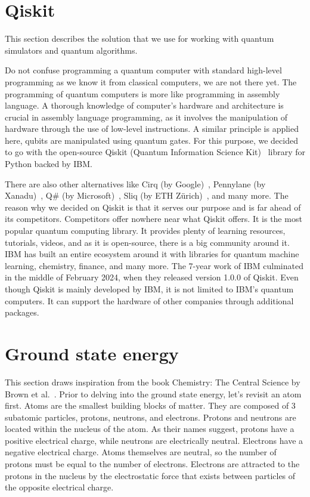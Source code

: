 \section{Qiskit}
This section describes the solution that we use for working with quantum simulators and quantum algorithms.

Do not confuse programming a quantum computer with standard high-level programming as we know it from classical computers, we are not there yet. The programming of quantum computers is more like programming in assembly language. A thorough knowledge of computer's hardware and architecture is crucial in assembly language programming, as it involves the manipulation of hardware through the use of low-level instructions. A similar principle is applied here, qubits are manipulated using quantum gates. For this purpose, we decided to go with the open-source Qiskit (Quantum Information Science Kit)~\cite{qiskit} library for Python backed by IBM.

There are also other alternatives like Cirq (by Google)~\cite{cirq}, Pennylane (by Xanadu)~\cite{pennylane}, Q\# (by Microsoft)~\cite{qsharp}, Sliq (by ETH Zürich)~\cite{sliq}, and many more. The reason why we decided on Qiskit is that it serves our purpose and is far ahead of its competitors. Competitors offer nowhere near what Qiskit offers. It is the most popular quantum computing library. It provides plenty of learning resources, tutorials, videos, and as it is open-source, there is a big community around it. IBM has built an entire ecosystem around it \cite{qiskit_ecosystem} with libraries for quantum machine learning, chemistry, finance, and many more. The 7-year work of IBM culminated in the middle of February 2024, when they released version 1.0.0 of Qiskit. Even though Qiskit is mainly developed by IBM, it is not limited to IBM's quantum computers. It can support the hardware of other companies through additional packages.

\section{Ground state energy}
This section draws inspiration from the book Chemistry: The Central Science by Brown et al.~\cite{chemistry}. Prior to delving into the ground state energy, let's revisit an atom first. Atoms are the smallest building blocks of matter. They are composed of 3 subatomic particles, protons, neutrons, and electrons. Protons and neutrons are located within the nucleus of the atom. As their names suggest, protons have a positive electrical charge, while neutrons are electrically neutral. Electrons have a negative electrical charge. Atoms themselves are neutral, so the number of protons must be equal to the number of electrons. Electrons are attracted to the protons in the nucleus by the electrostatic force that exists between particles of the opposite electrical charge.

